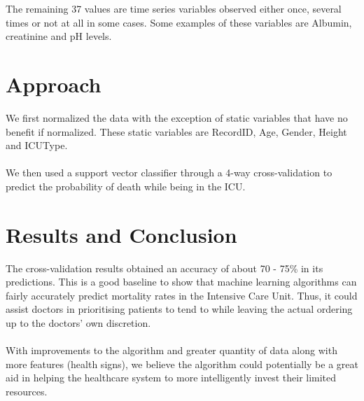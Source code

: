 \documentclass[12pt, letterpaper]{article}
\begin{document}
The remaining 37 values are time series variables observed either once, several times or not at all in some cases. Some examples of these variables are Albumin, creatinine and pH levels. \\

\section{Approach}
We first normalized the data with the exception of static variables that have no benefit if normalized. These static variables are RecordID, Age, Gender, Height and ICUType. \\
\\
We then used a support vector classifier through a 4-way cross-validation to predict the probability of death while being in the ICU. \\

\section{Results and Conclusion}
The cross-validation results obtained an accuracy of about 70 - 75\% in its predictions. This is a good baseline to show that machine learning algorithms can fairly accurately predict mortality rates in the Intensive Care Unit. Thus, it could assist doctors in prioritising patients to tend to while leaving the actual ordering up to the doctors’ own discretion. \\
\\
With improvements to the algorithm and greater quantity of data along with more features (health signs), we believe the algorithm could potentially be a great aid in helping the healthcare system to more intelligently invest their limited resources. \\
\newpage
\end{document}
